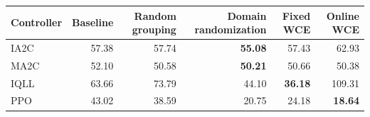 \begin{tabular}{lrrrrr}
\hline
Controller & Baseline & Random grouping & Domain randomization & Fixed WCE & Online WCE \\
\hline
IA2C & 57.38 & 57.74 & \textbf{55.08} & 57.43 & 62.93 \\
MA2C & 52.10 & 50.58 & \textbf{50.21} & 50.66 & 50.38 \\
IQLL & 63.66 & 73.79 & 44.10 & \textbf{36.18} & 109.31 \\
PPO & 43.02 & 38.59 & 20.75 & 24.18 & \textbf{18.64} \\
\hline
\end{tabular}
